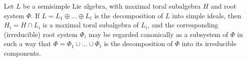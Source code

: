 Let $L$ be a semisimple Lie algebra, with maximal toral subalgebra $H$ and root system $\Phi$. If $L = L_1 \oplus \ldots \oplus L_t$ is the decomposition of $L$ into simple ideals, then $H_i = H \cap L_i$ is a maximal toral subalgebra of $L_i$, and the corresponding (irreducible) root system $\Phi_i$ may be regarded canonically as a subsystem of $\Phi$ in such a way that $\Phi = \Phi_1 \cup \ldots \cup \Phi_t$ is the decomposition of $\Phi$ into its irreducible components.